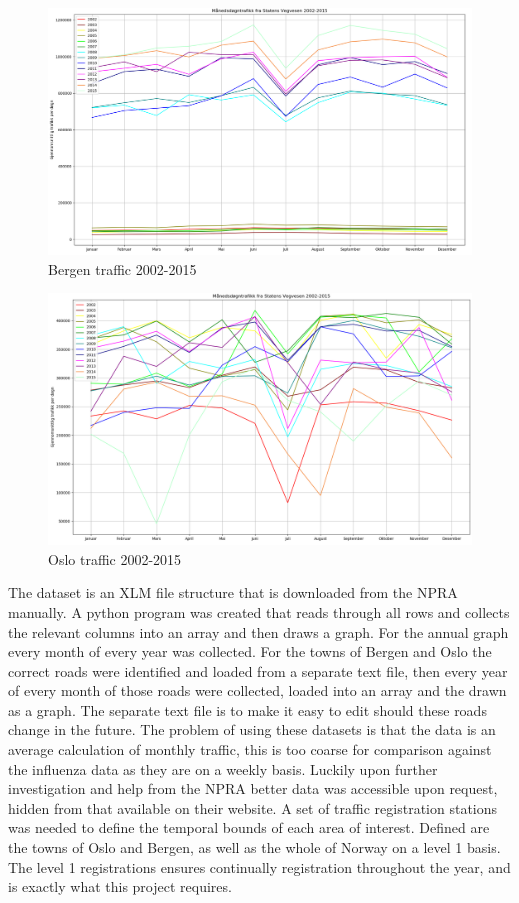 \documentclass[11pt]{report}
\begin{document}
\begin{figure}[ht]
\includegraphics[width=16cm]{xml_02_15_annual_bergen}
\centering
\caption{Bergen traffic 2002-2015}
\label{fig:anualbergen}
\end{figure}

\begin{figure}[ht]
\includegraphics[width=16cm]{xml_02_15_annual_oslo}
\centering
\caption{Oslo traffic 2002-2015}
\label{fig:anualoslo}
\end{figure}
The dataset is an XLM file structure that is downloaded from the NPRA manually. A python program was created that reads through all rows and collects the relevant columns into an array and then draws a graph. For the annual graph every month of every year was collected. For the towns of Bergen and Oslo the correct roads were identified and loaded from a separate text file, then every year of every month of those roads were collected, loaded into an array and the drawn as a graph. The separate text file is to make it easy to edit should these roads change in the future.
The problem of using these datasets is that the data is an average calculation of monthly traffic, this is too coarse for comparison against the influenza data as they are on a weekly basis. Luckily upon further investigation and help from the NPRA better data was accessible upon request, hidden from that available on their website. A set of traffic registration stations was needed to define the temporal bounds of each area of interest. Defined are the towns of Oslo and Bergen, as well as the whole of Norway on a level 1 basis. The level 1 registrations ensures continually registration throughout the year, and is exactly what this project requires.
\end{document}
